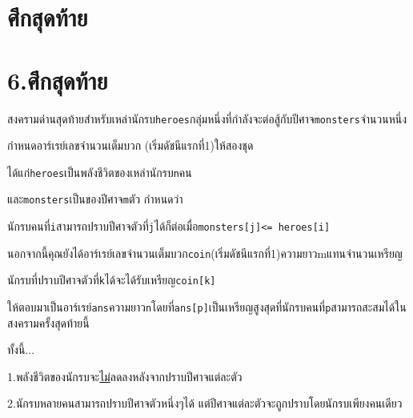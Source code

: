 \documentclass{article}
\begin{document}
\section*{ศึกสุดท้าย}

\section{\texorpdfstring{\textbf{6.ศึกสุดท้าย}}{6.ศึกสุดท้าย}}\label{uxe28uxe01uxe2auxe14uxe17uxe32uxe22}



สงครามด่านสุดท้ายสำหรับเหล่านักรบ\texttt{heroes}กลุ่มหนึ่งที่กำลังจะต่อสู้กับปีศาจ\texttt{monsters}จำนวนหนึ่ง

กำหนดอาร์เรย์เลขจำนวนเต็มบวก (เริ่มดัชนีแรกที่1)ให้สองชุด

ได้แก่\texttt{heroes}เป็นพลังชีวิตของเหล่านักรบ\texttt{n}คน

และ\texttt{monsters}เป็นของปีศาจ\texttt{m}ตัว กำหนดว่า

นักรบคนที่\texttt{i}สามารถปราบปีศาจตัวที่\texttt{j}ได้ก็ต่อเมื่อ\texttt{monsters{[}j{]}\textless{}=\ heroes{[}i{]}}



นอกจากนี้คุณยังได้อาร์เรย์เลขจำนวนเต็มบวก\texttt{coin}(เริ่มดัชนีแรกที่1)ความยาวmแทนจำนวนเหรียญ

นักรบที่ปราบปีศาจตัวที่\texttt{k}ได้จะได้รับเหรียญ\texttt{coin{[}k{]}}



ให้ตอบมาเป็นอาร์เรย์\texttt{ans}ความยาว\texttt{n}โดยที่\texttt{ans{[}p{]}}เป็นเหรียญสูงสุดที่นักรบคนที่\texttt{p}สามารถสะสมได้ในสงครามครั้งสุดท้ายนี้

ทั้งนี้...



1.พลังชีวิตของนักรบจะ\ul{ไม่}ลดลงหลังจากปราบปีศาจแต่ละตัว



2.นักรบหลายคนสามารถปราบปีศาจตัวหนึ่งๆได้ แต่ปีศาจแต่ละตัวจะถูกปราบโดยนักรบเพียงคนเดียว
\end{document}
